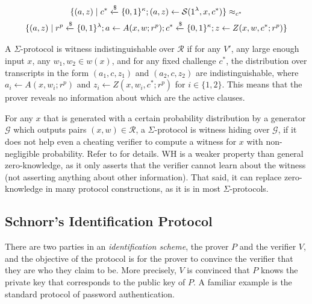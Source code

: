 \begin{definition}
\begin{enumerate}
    \begin{multline*}
        \{(a, z) \mid c^* \xleftarrow{\$} \{0,1\}^\kappa; (a,z) \leftarrow \mathcal S(1^\lambda,x,c^*)\} 
        \approx_{c^*} \\
        \{(a,z) \mid r^p \xleftarrow{\$} \{0,1\}^\lambda; a \leftarrow A(x,w;r^p); c^* \xleftarrow{\$} \{0,1\}^\kappa; z \leftarrow Z(x,w,c^*;r^p)\}
    \end{multline*}
\end{enumerate}
\end{definition}

\begin{definition}
A $\Sigma$-protocol is witness indistinguishable over $\mathcal R$ if for any $V'$, any large enough input $x$, any $w_1,w_2 \in w(x)$, and for any fixed challenge $c^*$, the distribution over transcripts in the form $(a_1, c, z_1)$ and $(a_2,c,z_2)$ are indistinguishable, where $a_i \leftarrow A(x,w_i;r^p)$ and $z_i \leftarrow Z(x,w_i, c^*; r^p)$ for $i \in \{1,2\}$. This means that the prover reveals no information about which are the active clauses. 
\end{definition}

\begin{definition}
For any $x$ that is generated with a certain probability distribution by a generator $\mathcal G$ which outputs pairs $(x,w) \in \mathcal R$, a $\Sigma$-protocol is witness hiding over $\mathcal G$, if it does not help even a cheating verifier to compute a witness for $x$ with non-negligible probability. Refer to \cite{10.1145/100216.100272} for details. WH is a weaker property than general zero-knowledge, as it only asserts that the verifier cannot learn about the witness (not asserting anything about other information). That said, it can replace zero-knowledge in many protocol constructions, as it is in most $\Sigma$-protocols.

\end{definition}

\subsection{Schnorr's Identification Protocol}
There are two parties in an \textit{identification scheme}, the prover $P$ and the verifier $V$, and the objective of the protocol is for the prover to convince the verifier that they are who they claim to be. More precisely, $V$ is convinced that $P$ knows the private key that corresponds to the public key of $P$. A familiar example is the standard protocol of password authentication.

